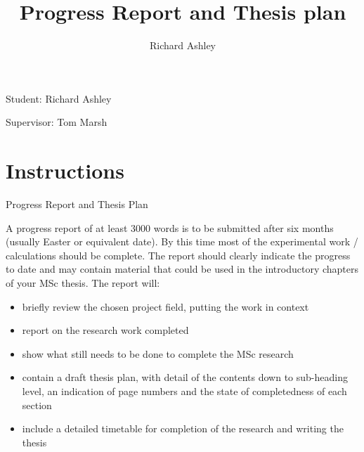 \documentclass[a4paper,10pt]{article}
\begin{document}
\title{Progress Report and Thesis plan}
\author{Richard Ashley}
\maketitle
\begin{flushright}
Student: Richard Ashley

Supervisor: Tom Marsh
\end{flushright}

\section{Instructions}

Progress Report and Thesis Plan

A progress report of at least 3000 words is to be submitted after six months (usually Easter or equivalent date). By this time most of the experimental work / calculations should be complete. The report should clearly indicate the progress to date and may contain material that could be used in the introductory chapters of your MSc thesis. The report will:

\begin{itemize}
\item briefly review the chosen project field, putting the work in context
\item report on the research work completed
\item show what still needs to be done to complete the MSc research
\item contain a draft thesis plan, with detail of the contents down to sub-heading level, an indication of page numbers and the state of completedness of each section
\item include a detailed timetable for completion of the research and writing the thesis
\end{itemize}
\end{document}
